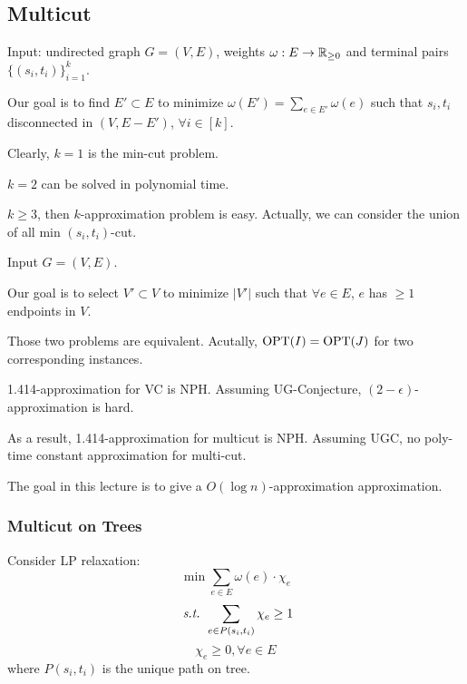 \subsection{Multicut}
\begin{example}[Multicut]
    Input: undirected graph  $ G=(V,E) $, weights  $ \omega:E\rightarrow\mathbb R_{ \geq 0} $ and terminal pairs  $ \{(s_i,t_i)\}_{i=1}^k $.
    
    Our goal is to find  $ E'\subset E $ to  minimize  $ \omega(E')=\sum_{e\in E'}\omega(e) $ such that  $ s_i,t_i $ disconnected in  $ (V,E-E') $,  $ \forall i\in [k] $.     
\end{example}

Clearly,  $ k=1 $ is the min-cut problem.

\begin{theorem}
    $ k=2 $ can be solved in polynomial time. 
\end{theorem}
\begin{fact}
    $ k \geq 3 $, then  $ k $-approximation problem is easy. Actually, we can consider the union of all  min $ (s_i,t_i) $-cut.  
\end{fact}

\begin{example}
    Input  $ G=(V,E) $.

    Our goal is to select  $ V'\subset V  $ to minimize  $ |V'| $ such that  $ \forall e\in E $,  $ e  $ has  $  \geq 1 $ endpoints in  $ V $.    
\end{example}

Those two problems are equivalent. Acutally,  $ \mathrm{OPT}(I)=\mathrm{OPT}(J) $ for two corresponding instances.


\begin{theorem}
    1.414-approximation for VC is NPH. Assuming UG-Conjecture,  $ (2-\epsilon) $-approximation is hard.

    As a result, 1.414-approximation for multicut is NPH. Assuming UGC, no poly-time constant approximation for multi-cut.
\end{theorem}

The goal in this lecture is to give a  $ O(\log n) $-approximation approximation. 

\subsubsection{Multicut on Trees}
Consider LP relaxation:
\[\min \sum_{e\in E }\omega(e)\cdot\chi_e\]
\[\textit{ s.t. } \sum_{e\in P(s_i,t_i)}\chi_e \geq 1\]
\[\chi_e \geq 0,\forall e\in E\]
where  $ P(s_i,t_i) $  is the unique path on tree.

